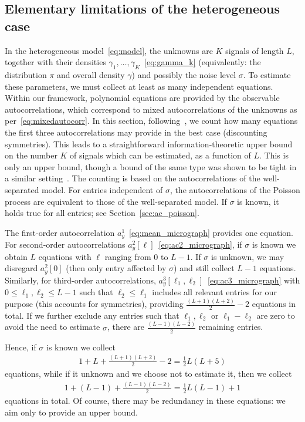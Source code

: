 \documentclass[12pt]{article}
\newcommand{\1}{\mathbf{1}}
\theoremstyle{plain}
\theoremstyle{definition}
\theoremstyle{remark}
\theoremstyle{plain}
\theoremstyle{remark}
\theoremstyle{plain}
\theoremstyle{plain}
\theoremstyle{plain}
\numberwithin{equation}{section}
\begin{document}
\subsection{Elementary limitations of the heterogeneous case}
\label{sec:heterogeneity}



In the heterogeneous model~\eqref{eq:model}, the unknowns are $K$ signals of length $L$, together with their densities $\gamma_1, \ldots, \gamma_K$~\eqref{eq:gamma_k} (equivalently: the distribution $\pi$ and overall density $\gamma$) and possibly the noise level $\sigma$. To estimate these parameters, we must collect at least as many independent equations. Within our framework, polynomial equations are provided by the observable autocorrelations, which correspond to mixed autocorrelations of the unknowns as per~\eqref{eq:mixedautocorr}. In this section, following~\cite{boumal2017heterogeneous}, we count how many equations the first three autocorrelations may provide in the best case (discounting symmetries). This leads to a straightforward information-theoretic upper bound on the number $K$ of signals which can be estimated, as a function of $L$. This is only an upper bound, though a bound of the same type was shown to be tight in a similar setting~\cite{bandeira2017estimation}.
The counting is based on the autocorrelations of the well-separated model. For entries independent of $\sigma$, the autocorrelations of the Poisson process are equivalent to those of the well-separated model. If $\sigma$ is known, it holds true for all entries; see Section~\ref{sec:ac_poisson}.


The first-order autocorrelation $a_y^1$~\eqref{eq:mean_micrograph} provides one equation. For second-order autocorrelations $a_y^2[\ell]$~\eqref{eq:ac2_micrograph}, if $\sigma$ is known we obtain $L$ equations with $\ell$ ranging from 0 to $L-1$. If $\sigma$ is unknown, we may disregard $a_y^2[0]$ (then only entry affected by $\sigma$) and still collect $L-1$ equations. Similarly, for third-order autocorrelations, $a_y^3[\ell_1, \ell_2]$~\eqref{eq:ac3_micrograph} with $0 \leq \ell_1, \ell_2 \leq L-1$ such that $\ell_2 \leq \ell_1$ includes all relevant entries for our purpose (this accounts for symmetries), providing $\frac{(L+1)(L+2)}{2}-2$ equations in total. 
If we further exclude any entries such that $\ell_1, \ell_2$ or $\ell_1 - \ell_2$ are zero to avoid the need to estimate $\sigma$, there are $\frac{(L-1)(L-2)}{2}$ remaining entries.

Hence, if $\sigma$ is known we collect
\begin{align*}
	1 + L + \frac{(L+1)(L+2)}{2}-2 = \frac{1}{2} L (L+5)
\end{align*}
equations, while if it unknown and we choose not to estimate it, then we collect
\begin{align*}
	1 + (L-1) + \frac{(L-1)(L-2)}{2} = \frac{1}{2} L (L-1) + 1
\end{align*}
equations in total. Of course, there may be redundancy in these equations: we aim only to provide an upper bound. %
\end{document}
